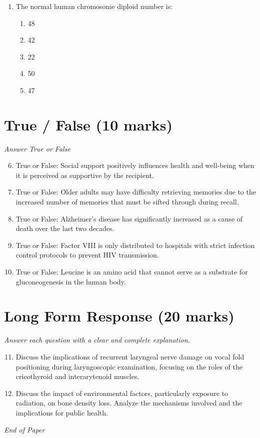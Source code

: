 \documentclass[12pt]{article}
\begin{document}
\begin{enumerate}[label=\arabic*.]
\begin{enumerate}[label=(\alph*)]
    \item 72
    \item 88
    \item 82
    \item 78
    \item 80
\end{enumerate}
\item The normal human chromosome diploid number is:
\begin{enumerate}[label=(\alph*)]
    \item 48
    \item 42
    \item 22
    \item 50
    \item 47
\end{enumerate}
\end{enumerate}

\section*{True / False (10 marks)}
\textit{Answer True or False}
\begin{enumerate}[label=\arabic*.]
\setcounter{enumi}{5}
\item True or False: Social support positively influences health and well-being when it is perceived as supportive by the recipient.
\item True or False: Older adults may have difficulty retrieving memories due to the increased number of memories that must be sifted through during recall.
\item True or False: Alzheimer's disease has significantly increased as a cause of death over the last two decades.
\item True or False: Factor VIII is only distributed to hospitals with strict infection control protocols to prevent HIV transmission.
\item True or False: Leucine is an amino acid that cannot serve as a substrate for gluconeogenesis in the human body.
\end{enumerate}

\section*{Long Form Response (20 marks)}
\textit{Answer each question with a clear and complete explanation.}
\begin{enumerate}[label=\arabic*.]
\setcounter{enumi}{10}
\item Discuss the implications of recurrent laryngeal nerve damage on vocal fold positioning during laryngoscopic examination, focusing on the roles of the cricothyroid and interarytenoid muscles.
\item Discuss the impact of environmental factors, particularly exposure to radiation, on bone density loss. Analyze the mechanisms involved and the implications for public health.
\end{enumerate}

\vfill
\noindent\textit{End of Paper}
\end{document}
